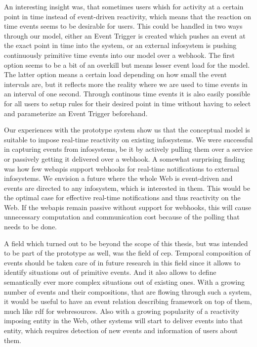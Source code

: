 An interesting insight was, that sometimes users whish for activity at a certain point in time instead of event-driven reactivity, which means that the reaction on time events seems to be desirable for users.
This could be handled in two ways through our model, either an \textrm{Event Trigger} is created which pushes an event at the exact point in time into the system, or an external \textrm{\gls{infosystem}} is pushing continuously primitive time events into our model over a \textrm{\gls{webhook}}.
The first option seems to be a bit of an overkill but means lesser event load for the model.
The latter option means a certain load depending on how small the event intervals are, but it reflects more the reality where we are used to time events in an interval of one second.
Through continous time events it is also easily possible for all users to setup rules for their desired point in time without having to select and parameterize an \textrm{Event Trigger} beforehand.

Our experiences with the prototype system show us that the conceptual model is suitable to impose real-time reactivity on existing \textrm{\glspl{infosystem}}.
We were successful in capturing events from \textrm{\glspl{infosystem}}, be it by actively pulling them over a service or passively getting it delivered over a \textrm{\gls{webhook}}.
A somewhat surprising finding was how few \textrm{\glspl{webapi}} support \textrm{\glspl{webhook}} for real-time notifications to  external \textrm{\glspl{infosystem}}.
We envision a future where the whole Web is event-driven and events are directed to any \textrm{\gls{infosystem}}, which is interested in them.
This would be the optimal case for effective real-time notifications and thus reactivity on the Web.
If the \textrm{\glspl{webapi}} remain passive without support for \textrm{\glspl{webhook}}, this will cause unnecessary computation and communication cost because of the polling that needs to be done.

A field which turned out to be beyond the scope of this thesis, but was intended to be part of the prototype as well, was the field of \textrm{\acrshort{cep}}.
Temporal composition of events should be taken care of in future research in this field since it allows to identify situations out of primitive events.
And it also allows to define semantically ever more complex situations out of existing ones.
With a growing number of events and their compositions, that are flowing through such a system, it would be useful to have an event relation describing framework on top of them, much like \textrm{\acrshort{rdf}} for \textrm{\glspl{webresource}}.
Also with a growing popularity of a reactivity imposing entity in the \textrm{Web}, other systems will start to deliver events into that entity, which requires detection of new events and information of users about them.

